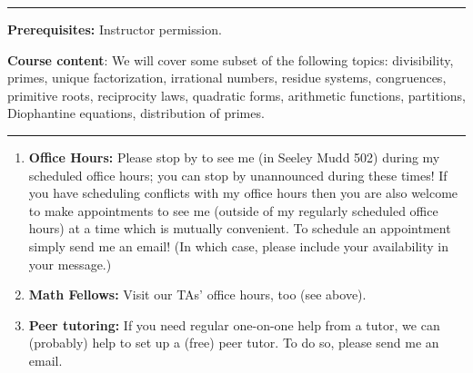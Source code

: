 \documentclass[12pt]{article}
\begin{document}



          



\medskip \hrule \medskip

\noindent\textbf{Prerequisites:} Instructor permission.
\smallskip

\noindent \textbf{Course content}: We will cover some subset of the following topics: divisibility, primes, unique factorization, irrational numbers, residue systems, congruences, primitive roots, reciprocity laws, quadratic forms, arithmetic functions, partitions, Diophantine equations, distribution of primes.

\smallskip \hrule \medskip
{}
\begin{enumerate}
\item[]{\bf Office Hours:} Please stop by to see me (in Seeley Mudd 502) during my scheduled office hours; you can stop by unannounced during these times! If you have scheduling conflicts with my office hours then you are also welcome to make appointments to see me (outside of my regularly scheduled office hours) at a time which is mutually convenient. To schedule an appointment simply send me an email! (In which case, please include your availability in your message.)
\item[] {\bf Math Fellows:} Visit our TAs' office hours, too (see above).
\item[] {\bf Peer tutoring:} If you need regular one-on-one help from a tutor, we can (probably) help to set up a (free) peer tutor. To do so, please send me an email.
\end{enumerate}
\end{document}
